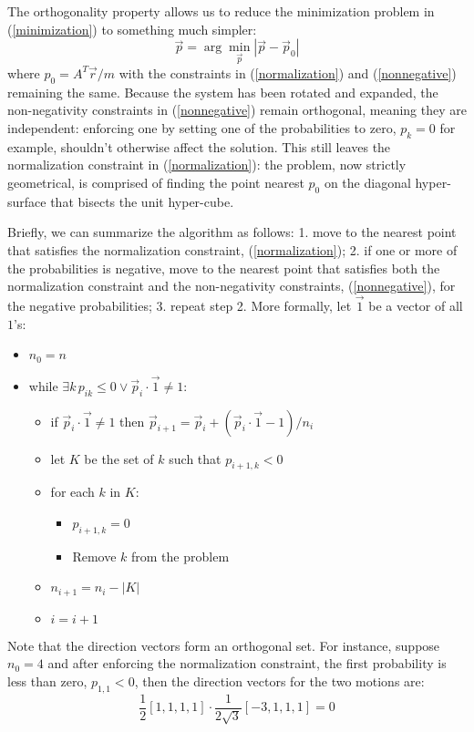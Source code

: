 The orthogonality property allows us to reduce the minimization problem 
in (\ref{minimization}) to something much simpler:
\begin{equation}
	\vec p = \arg \min_{\vec p} | \vec p - \vec p_0 |
\end{equation}
where $p_0 = A^T \vec r/m$ with the constraints in (\ref{normalization}) and
(\ref{nonnegative}) remaining the same.
Because the system has been rotated and expanded, the non-negativity 
constraints in (\ref{nonnegative}) remain orthogonal, meaning they are 
independent: enforcing one by setting one of the probabilities to zero, 
$p_k=0$ for example, shouldn't otherwise affect the solution.
This still leaves the normalization constraint in (\ref{normalization}):
the problem, now strictly geometrical, is comprised of finding the point nearest $p_0$ on the diagonal hyper-surface that bisects the unit hyper-cube.

Briefly, we can summarize the algorithm as follows:
1. move to the nearest point that satisfies the normalization constraint,
(\ref{normalization}); 2. if one or more of the probabilities is negative,
move to the nearest point that satisfies both 
the normalization constraint
and the non-negativity constraints, (\ref{nonnegative}), for the negative probabilities;
3. repeat step 2.
More formally, let $\vec 1$ be a vector of all $1$'s:
\begin{itemize}
	\item $n_0=n$
	\item while $\exists k \, p_{ik} \le 0 \lor \vec p_i \cdot \vec 1 \ne 1$:
	\begin{itemize}
		\item if $\vec p_i \cdot \vec 1 \ne 1$ then 
		$\vec p_{i+1} = \vec p_i + (\vec p_i \cdot \vec 1 - 1)/n_i$
		\item let $K$ be the set of $k$ such that $p_{i+1,k} < 0$
		\item for each $k$ in $K$:
		\begin{itemize}
			\item $p_{i+1,k}=0$
			\item Remove $k$ from the problem
		\end{itemize}
		\item $n_{i+1}=n_i-|K|$
		\item $i=i+1$
	\end{itemize}
\end{itemize}

Note that the direction vectors form an orthogonal set.
For instance, suppose $n_0=4$ and after enforcing the normalization constraint,
the first probability is less than zero, $p_{1,1} < 0$,
then the direction vectors for the two motions are:
\begin{equation}
	\frac{1}{2}[1, 1, 1, 1] \cdot \frac{1}{2\sqrt{3}} [-3, 1, 1, 1] = 0
\end{equation}

